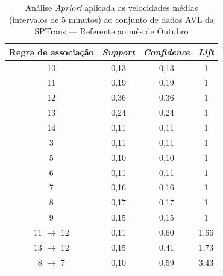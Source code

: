 \documentclass[
	12pt,				%
	oneside,			%
	a4paper,			%
	english,			%
	brazil				%
	]{abntex2ppgsi}
\begin{document}
{{\begin{apendicesenv}
\begin{table}[!htb]
\centering
\caption {Análise \textit{Apriori} aplicada as velocidades médias (intervalos de 5 minutos) ao conjunto de dados AVL da SPTrans --- Referente ao mês de Outubro}
\label {tab:aprioriOctober}
\begin{tabular}{c|c|c|c}
\toprule
\textbf{Regra de associação} & \textit{\textbf{Support}} & \textit{\textbf{Confidence}} & \textit{\textbf{Lift}} \\
\midrule
10 &  0,13 &  0,13 &  1\\
\hline
11 &  0,19 &  0,19 &  1\\
\hline
12 &  0,36 &  0,36 &  1\\
\hline
13 &  0,24 &  0,24 &  1\\
\hline
14 &  0,11 &  0,11 &  1\\
\hline
3 &  0,11 &  0,11 &  1\\
\hline
5 &  0,10 &  0,10 &  1\\
\hline
6 &  0,11 &  0,11 &  1\\
\hline
7 &  0,16 &  0,16 &  1\\
\hline
8 &  0,17 &  0,17 &  1\\
\hline
9 &  0,15 &  0,15 &  1\\
\hline
11 $\rightarrow$ 12 &  0,11 &  0,60 &  1,66\\
\hline
13 $\rightarrow$ 12 &  0,15 &  0,41 &  1,73\\
\hline
8 $\rightarrow$ 7 &  0,10 &  0,59 &  3,43\\
\bottomrule
\end{tabular}
\end{table}



\end{apendicesenv}}}
\end{document}
